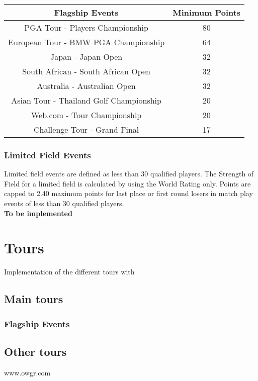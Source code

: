 \documentclass{article}
\begin{document}
\begin{center}
\begin{tabular}{ | c | c | }
\hline
Flagship Events	&Minimum Points\\
\hline
PGA Tour - Players Championship	&80\\
European Tour - BMW PGA Championship&	64\\
Japan - Japan Open	&32\\
South African - South African Open	&32\\
Australia - Australian Open	&32\\
Asian Tour - Thailand Golf Championship	&20\\
Web.com - Tour Championship	&20\\
Challenge Tour - Grand Final	&17\\
\hline
\end{tabular}
\end{center}

\subsubsection{Limited Field Events}

Limited field events are defined as less than 30 qualified players. The Strength of Field for a limited field is calculated by using the World Rating only. Points are capped to 2.40 maximum points for last place or first round losers in match play events of less than 30 qualified players.\\
\textbf{\color{orange} To be implemented}

\clearpage

\section{Tours}

Implementation of the different tours with

\subsection{Main tours}
\subsubsection{Flagship Events}
\subsection{Other tours}


\begin{thebibliography}{9}
	 www.owgr.com%
\end{thebibliography}
\end{document}
